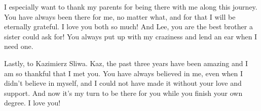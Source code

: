 I especially want to thank my parents for being there with me along this journey.  You have always been there for me, no matter what, and for that I will be eternally grateful.  I love you both so much!  And Lee, you are the best brother a sister could ask for!  You always put up with my craziness and lend an ear when I need one.

Lastly, to Kazimierz Sliwa.  Kaz, the past three years have been amazing and I am so thankful that I met you.  You have always believed in me, even when I didn't believe in myself, and I could not have made it without your love and support.  And now it's my turn to be there for you while you finish your own degree.  I love you!


